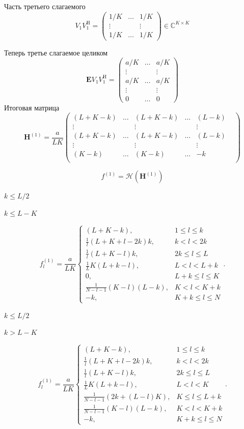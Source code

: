 \documentclass[specialist,
               substylefile = spbu.rtx,
               subf,href,colorlinks=true, 12pt]{disser}
\begin{document}
Часть третьего слагаемого
$$V_1 V_1^{\mathrm{H}} = \begin{pmatrix}
	1/K & \ldots & 1/K\\
	\vdots & & \vdots\\
	1/K &   \ldots &  1/K
\end{pmatrix}\in \mathbb{C}^{K \times K}$$

Теперь третье слагаемое целиком
$$\mathbf{E} V_1 V_1^{\mathrm{H}} = \begin{pmatrix}
	a/K &  \ldots & a/K\\
	\vdots & & \vdots\\
	a/K &  \ldots & a/K\\
	\vdots & & \vdots\\
	0 & \ldots & 0
\end{pmatrix}$$
Итоговая матрица
$$\mathbf{H}^{(1)} = \frac{a}{LK}\begin{pmatrix}
	(L + K - k) & \ldots & (L + K - k) & \ldots & (L - k)\\
	\vdots & & \vdots & & \vdots \\
	(L + K - k) & \ldots & (L + K - k) & \ldots & (L - k) & \\
	\vdots & & \vdots & & \vdots \\
	(K - k) & \ldots & (K - k) & \ldots & -k \\
\end{pmatrix}$$

$$f^{(1)} = \mathcal{H}(\mathbf{H}^{(1)})$$

$k \leq L/2$

$k \leq L - K$

$$f^{(1)}_l = \frac{a}{{LK}}
\begin{cases}
	(L + K - k), & \text{$1 \leq l \leq k$}\\
	\frac{1}{l}(L + K + l - 2k)k, & \text{$k < l < 2k$}\\
	\frac{1}{l}(L + K - l)k, &\text{$2k \leq l \leq L$}\\
	\frac{1}{L}K(L + k - l), &\text{$L < l < L + k$}\\
	0, &\text{$L + k \leq l \leq K$}\\
	\frac{1}{N - l - 1}(K - l)(L - k), &\text{$K < l < K + k$}\\
	-k, &\text{$K + k \leq l \leq N $}
\end{cases}.
$$

$k \leq L/2$

$k > L - K$

$$f^{(1)}_l = \frac{a}{{LK}}
\begin{cases}
	(L + K - k), & \text{$1 \leq l \leq k$}\\
	\frac{1}{l}(L + K + l - 2k)k, & \text{$k < l < 2k$}\\
	\frac{1}{l}(L + K - l)k, &\text{$2k \leq l \leq L$}\\
	\frac{1}{L}K(L + k- l), &\text{$L < l < K$}\\
	\frac{1}{N - l - 1}(2k + (L - l)K), &\text{$K \leq l \leq L + k$}\\
	\frac{1}{N - l - 1}( K - l)(L - k), &\text{$K < l < K + k$}\\
	-k, &\text{$K + k \leq l \leq N$}
\end{cases}.
$$
\end{document}
